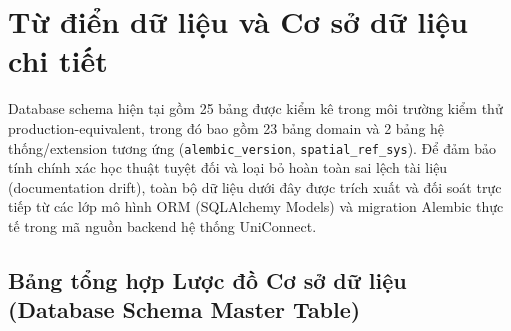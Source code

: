 \chapter{Từ điển dữ liệu và Cơ sở dữ liệu chi tiết}
\label{apd:B}

Database schema hiện tại gồm 25 bảng được kiểm kê trong môi trường kiểm thử production-equivalent, trong đó bao gồm 23 bảng domain và 2 bảng hệ thống/extension tương ứng (\texttt{alembic\_version}, \texttt{spatial\_ref\_sys}). Để đảm bảo tính chính xác học thuật tuyệt đối và loại bỏ hoàn toàn sai lệch tài liệu (documentation drift), toàn bộ dữ liệu dưới đây được trích xuất và đối soát trực tiếp từ các lớp mô hình ORM (SQLAlchemy Models) và migration Alembic thực tế trong mã nguồn backend hệ thống UniConnect.

\section{Bảng tổng hợp Lược đồ Cơ sở dữ liệu (Database Schema Master Table)}

